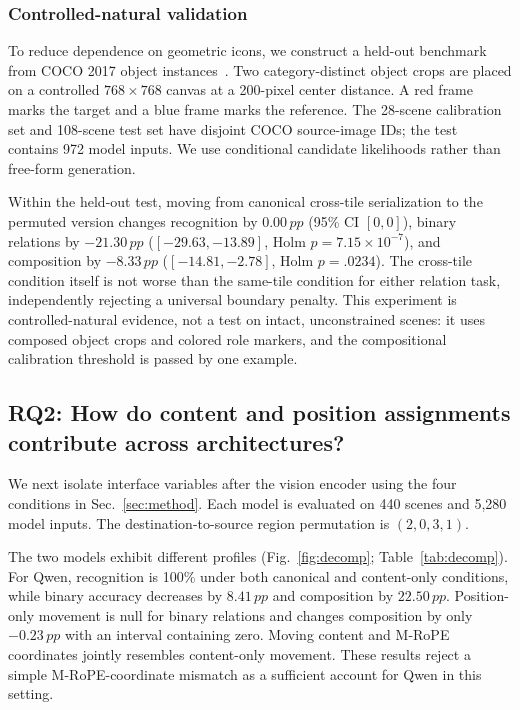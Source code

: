\documentclass[10pt,twocolumn,letterpaper]{article}
\newcommand{\pp}{\,pp}
\begin{document}
\subsubsection{Controlled-natural validation}
\label{sec:natural}

To reduce dependence on geometric icons, we construct a held-out benchmark from COCO 2017 object instances~\cite{lin2014coco}.
Two category-distinct object crops are placed on a controlled $768\!\times\!768$ canvas at a 200-pixel center distance.
A red frame marks the target and a blue frame marks the reference.
The 28-scene calibration set and 108-scene test set have disjoint COCO source-image IDs; the test contains 972 model inputs.
We use conditional candidate likelihoods rather than free-form generation.

Within the held-out test, moving from canonical cross-tile serialization to the permuted version changes recognition by $0.00\pp$ (95\% CI $[0,0]$), binary relations by $-21.30\pp$ ($[-29.63,-13.89]$, Holm $p=7.15\!\times\!10^{-7}$), and composition by $-8.33\pp$ ($[-14.81,-2.78]$, Holm $p=.0234$).
The cross-tile condition itself is not worse than the same-tile condition for either relation task, independently rejecting a universal boundary penalty.
This experiment is controlled-natural evidence, not a test on intact, unconstrained scenes: it uses composed object crops and colored role markers, and the compositional calibration threshold is passed by one example.

\subsection{RQ2: How do content and position assignments contribute across architectures?}
\label{sec:decomp}

We next isolate interface variables after the vision encoder using the four conditions in Sec.~\ref{sec:method}.
Each model is evaluated on 440 scenes and 5,280 model inputs.
The destination-to-source region permutation is $(2,0,3,1)$.

The two models exhibit different profiles (Fig.~\ref{fig:decomp}; Table~\ref{tab:decomp}).
For Qwen, recognition is 100\% under both canonical and content-only conditions, while binary accuracy decreases by $8.41\pp$ and composition by $22.50\pp$.
Position-only movement is null for binary relations and changes composition by only $-0.23\pp$ with an interval containing zero.
Moving content and M-RoPE coordinates jointly resembles content-only movement.
These results reject a simple M-RoPE-coordinate mismatch as a sufficient account for Qwen in this setting.
\end{document}
